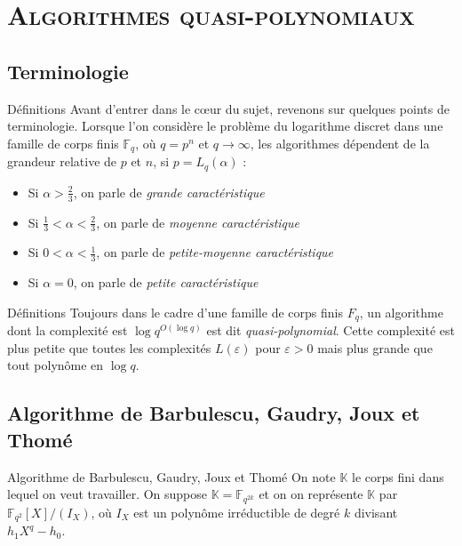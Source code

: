 \documentclass[xcolor=x11names,compress]{beamer}
\theoremstyle{break}
\theoremstyle{sc}
\theoremstyle{definition}
\theoremstyle{remark}
\begin{document}
\section{\scshape Algorithmes quasi-polynomiaux}
\subsection{Terminologie}
\begin{frame}{Définitions}
  Avant d'entrer dans le cœur du sujet, revenons sur quelques points de
  terminologie. Lorsque l'on considère le problème du logarithme discret dans
  une famille de corps finis $\mathbb{F}_{q}$, où $q=p^n$ et $q\to\infty$, les
  algorithmes dépendent de la grandeur relative de $p$ et $n$, si
  $p=L_q(\alpha)$ :
  \begin{itemize}
    \item Si $\alpha>\frac{2}{3}$, on parle de \emph{grande caractéristique}
    \item Si $\frac{1}{3} <\alpha<\frac{2}{3}$, on parle de \emph{moyenne caractéristique}
    \item Si $0 <\alpha<\frac{1}{3}$, on parle de \emph{petite-moyenne caractéristique}
    \item Si $\alpha = 0$, on parle de \emph{petite caractéristique}
  \end{itemize}
\end{frame}


\begin{frame}{Définitions}
 Toujours dans le cadre d'une famille de corps finis $F_q$, un algorithme dont
 la complexité est  $\log q^{O(\log q)}$ est dit \emph{quasi-polynomial}. Cette
 complexité est plus petite que toutes les complexités $L(\varepsilon)$ pour
 $\varepsilon>0$ mais plus grande que tout polynôme en $\log q$.
\end{frame}

\subsection{Algorithme de Barbulescu, Gaudry, Joux et Thomé}

\begin{frame}{Algorithme de Barbulescu, Gaudry, Joux et Thomé}
  On note $\mathbb{K}$ le corps fini dans lequel on veut travailler.
  On suppose $\mathbb{K}=\mathbb{F}_{q^{2k}}$ et on on représente
  $\mathbb{K}$ par $\mathbb{F}_{q^2}[X]/(I_X)$, où $I_X$ est un polynôme
  irréductible de degré $k$ divisant $h_1X^q-h_0$.

\end{frame}
\end{document}
